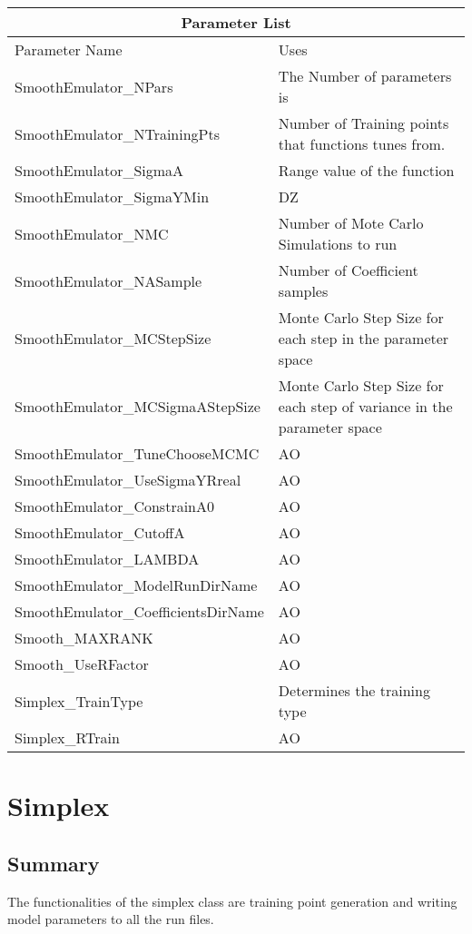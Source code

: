 \documentclass[12pt]{article}
\numberwithin{equation}{section}
\numberwithin{figure}{section}
\begin{document}
\begin{tabular}{ |p{8cm}||p{6cm}|  }
 \hline
 \multicolumn{2}{|c|}{Parameter List} \\
 \hline
 Parameter Name & Uses\\
 \hline
 SmoothEmulator\_NPars   & The Number of parameters is     \\
 SmoothEmulator\_NTrainingPts &   Number of Training points that functions tunes from.   \\
 SmoothEmulator\_SigmaA   & Range value of the function \\
 SmoothEmulator\_SigmaYMin   & DZ \\
 SmoothEmulator\_NMC &   Number of Mote Carlo Simulations to run  \\
 SmoothEmulator\_NASample & Number of Coefficient samples    \\
 SmoothEmulator\_MCStepSize & Monte Carlo Step Size for each step in the parameter space   \\
 SmoothEmulator\_MCSigmaAStepSize & Monte Carlo Step Size for each step of variance in the parameter space  \\
 SmoothEmulator\_TuneChooseMCMC & AO  \\
 SmoothEmulator\_UseSigmaYRreal & AO  \\
 SmoothEmulator\_ConstrainA0 & AO  \\
 SmoothEmulator\_CutoffA & AO  \\
 SmoothEmulator\_LAMBDA & AO  \\
 SmoothEmulator\_ModelRunDirName & AO  \\
 SmoothEmulator\_CoefficientsDirName  & AO  \\
 Smooth\_MAXRANK & AO  \\
 Smooth\_UseRFactor & AO  \\
 Simplex\_TrainType & Determines the training type  \\
 Simplex\_RTrain & AO  \\
 

 
 \hline
\end{tabular}


\section{Simplex}

\subsection{Summary}
The functionalities of the simplex class are training point generation and writing model parameters to all the run files. 
\end{document}
